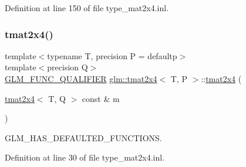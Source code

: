 Definition at line 150 of file type\+\_\+mat2x4.\+inl.

\mbox{\label{structglm_1_1tmat2x4_a8f8c262382e497559d75eed475deaa49}} 
\subsubsection{\texorpdfstring{tmat2x4()}{tmat2x4()}\hspace{0.1cm}{\footnotesize\ttfamily [19/22]}}
{\footnotesize\ttfamily template$<$typename T, precision P = defaultp$>$ \\
template$<$precision Q$>$ \\
\mbox{\hyperlink{setup_8hpp_a33fdea6f91c5f834105f7415e2a64407}{G\+L\+M\+\_\+\+F\+U\+N\+C\+\_\+\+Q\+U\+A\+L\+I\+F\+I\+ER}} \mbox{\hyperlink{structglm_1_1tmat2x4}{glm\+::tmat2x4}}$<$ T, P $>$\+::\mbox{\hyperlink{structglm_1_1tmat2x4}{tmat2x4}} (\begin{DoxyParamCaption}\item[{\mbox{\hyperlink{structglm_1_1tmat2x4}{tmat2x4}}$<$ T, Q $>$ const \&}]{m }\end{DoxyParamCaption})}



G\+L\+M\+\_\+\+H\+A\+S\+\_\+\+D\+E\+F\+A\+U\+L\+T\+E\+D\+\_\+\+F\+U\+N\+C\+T\+I\+O\+NS. 



Definition at line 30 of file type\+\_\+mat2x4.\+inl.

\mbox{\label{structglm_1_1tmat2x4_a8999dd2b5dc9b8af638c4e80ceebbf9b}} 
